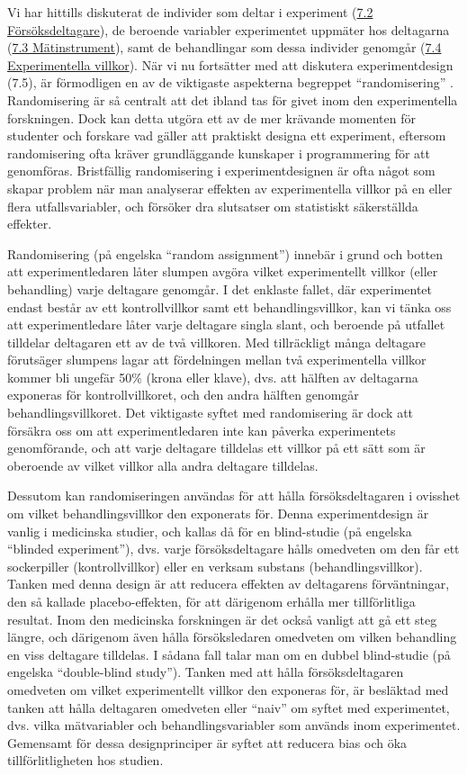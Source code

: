 \documentclass[
]{book}
\begin{document}
Vi har hittills diskuterat de individer som deltar i experiment (\protect\hyperlink{sec07.2}{7.2 Försöksdeltagare}), de beroende variabler experimentet uppmäter hos deltagarna (\protect\hyperlink{sec07.3}{7.3 Mätinstrument}), samt de behandlingar som dessa individer genomgår (\protect\hyperlink{sec07.4}{7.4 Experimentella villkor}). När vi nu fortsätter med att diskutera experimentdesign (7.5), är förmodligen en av de viktigaste aspekterna begreppet ``randomisering'' \citep{fisher1936design}. Randomisering är så centralt att det ibland tas för givet inom den experimentella forskningen. Dock kan detta utgöra ett av de mer krävande momenten för studenter och forskare vad gäller att praktiskt designa ett experiment, eftersom randomisering ofta kräver grundläggande kunskaper i programmering för att genomföras. Bristfällig randomisering i experimentdesignen är ofta något som skapar problem när man analyserar effekten av experimentella villkor på en eller flera utfallsvariabler, och försöker dra slutsatser om statistiskt säkerställda effekter.

Randomisering (på engelska ``random assignment'') innebär i grund och botten att experimentledaren låter slumpen avgöra vilket experimentellt villkor (eller behandling) varje deltagare genomgår. I det enklaste fallet, där experimentet endast består av ett kontrollvillkor samt ett behandlingsvillkor, kan vi tänka oss att experimentledare låter varje deltagare singla slant, och beroende på utfallet tilldelar deltagaren ett av de två villkoren. Med tillräckligt många deltagare förutsäger slumpens lagar att fördelningen mellan två experimentella villkor kommer bli ungefär 50\% (krona eller klave), dvs. att hälften av deltagarna exponeras för kontrollvillkoret, och den andra hälften genomgår behandlingsvillkoret. Det viktigaste syftet med randomisering är dock att försäkra oss om att experimentledaren inte kan påverka experimentets genomförande, och att varje deltagare tilldelas ett villkor på ett sätt som är oberoende av vilket villkor alla andra deltagare tilldelas.

Dessutom kan randomiseringen användas för att hålla försöksdeltagaren i ovisshet om vilket behandlingsvillkor den exponerats för. Denna experimentdesign är vanlig i medicinska studier, och kallas då för en blind-studie (på engelska ``blinded experiment''), dvs. varje försöksdeltagare hålls omedveten om den får ett sockerpiller (kontrollvillkor) eller en verksam substans (behandlingsvillkor). Tanken med denna design är att reducera effekten av deltagarens förväntningar, den så kallade placebo-effekten, för att därigenom erhålla mer tillförlitliga resultat. Inom den medicinska forskningen är det också vanligt att gå ett steg längre, och därigenom även hålla försöksledaren omedveten om vilken behandling en viss deltagare tilldelas. I sådana fall talar man om en dubbel blind-studie (på engelska ``double-blind study''). Tanken med att hålla försöksdeltagaren omedveten om vilket experimentellt villkor den exponeras för, är besläktad med tanken att hålla deltagaren omedveten eller ``naiv'' om syftet med experimentet, dvs. vilka mätvariabler och behandlingsvariabler som används inom experimentet. Gemensamt för dessa designprinciper är syftet att reducera bias och öka tillförlitligheten hos studien.
\end{document}

